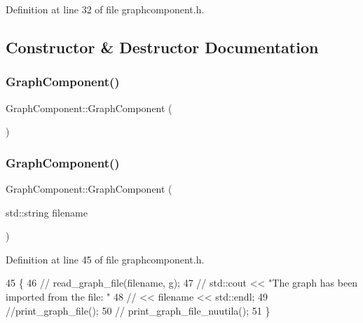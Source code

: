 Definition at line 32 of file graphcomponent.\+h.



\subsection{Constructor \& Destructor Documentation}
\mbox{\label{class_graph_component_a35c4a6e5c6f28751b1bd6c451cc07957}} 
\subsubsection{\texorpdfstring{Graph\+Component()}{GraphComponent()}\hspace{0.1cm}{\footnotesize\ttfamily [1/2]}}
{\footnotesize\ttfamily Graph\+Component\+::\+Graph\+Component (\begin{DoxyParamCaption}{ }\end{DoxyParamCaption})}

\mbox{\label{class_graph_component_a14482fdab4e309677b4a14ab8db13079}} 
\subsubsection{\texorpdfstring{Graph\+Component()}{GraphComponent()}\hspace{0.1cm}{\footnotesize\ttfamily [2/2]}}
{\footnotesize\ttfamily Graph\+Component\+::\+Graph\+Component (\begin{DoxyParamCaption}\item[{std\+::string}]{filename }\end{DoxyParamCaption})\hspace{0.3cm}{\ttfamily [inline]}}



Definition at line 45 of file graphcomponent.\+h.


\begin{DoxyCode}
45                                        \{
46        \textcolor{comment}{// read\_graph\_file(filename, g);}
47     \textcolor{comment}{//    std::cout << "The graph has been imported from the file: "}
48     \textcolor{comment}{//              << filename << std::endl;}
49         \textcolor{comment}{//print\_graph\_file();}
50        \textcolor{comment}{// print\_graph\_file\_nuutila();}
51     \}
\end{DoxyCode}



